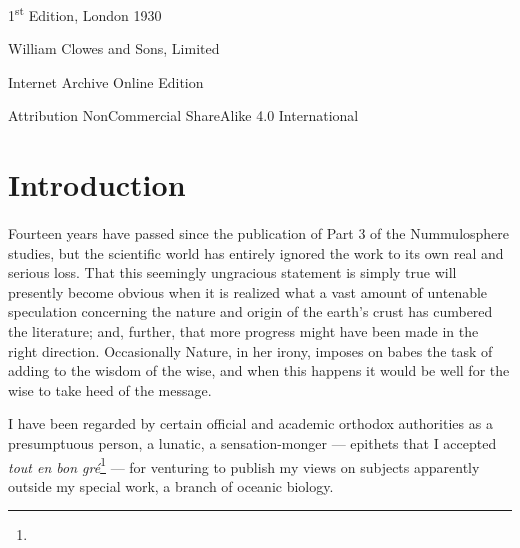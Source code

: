\documentclass[a4paper, 12pt, oneside]{article}
\begin{document}
\begin{titlepage}
	
		
	\vspace*{\fill}%
	
	1\textsuperscript{st} Edition, London 1930 %
	
	{\small William Clowes and Sons, Limited } %

	\vspace{1\baselineskip} %

    Internet Archive Online Edition  %
	
	{\small Attribution NonCommercial ShareAlike 4.0 International } %
\end{titlepage}
\setlength{\parskip}{1mm plus1mm minus1mm}
\setcounter{tocdepth}{3}
\setcounter{secnumdepth}{3}
\pagestyle{fancy}
\fancyhf{}
\cfoot{\Fontauri{\thepage}}
\tableofcontents
\clearpage
\listoffigures{}
\clearpage
\Large
\section*{Introduction}
\paragraph{}
Fourteen years have passed since the publication of Part 3 of the Nummulosphere studies, but the scientific world has entirely ignored the work to its own real and serious loss. That this seemingly ungracious statement is simply true will presently become obvious when it is realized what a vast amount of untenable speculation concerning the nature and origin of the earth's crust has cumbered the literature; and, further, that more progress might have been made in the right direction. Occasionally Nature, in her irony, imposes on babes the task of adding to the wisdom of the wise, and when this happens it would be well for the wise to take heed of the message.

I have been regarded by certain official and academic orthodox authorities as a presumptuous person, a lunatic, a sensation-monger --- epithets that I accepted \emph{tout en bon gré}\footnote{} --- for venturing to publish my views on subjects apparently outside my special work, a branch of oceanic biology.
\end{document}
